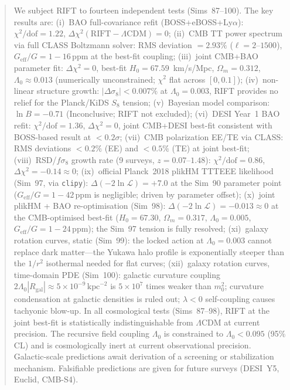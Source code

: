 \documentclass[12pt,a4paper]{article}
\begin{document}
\begin{abstract}
We subject RIFT to fourteen independent tests (Sims~87--100).
The key results are:
(i)~BAO full-covariance refit (BOSS+eBOSS+Ly$\alpha$):
    $\chi^2/\mathrm{dof}=1.22$, $\Delta\chi^2(\mathrm{RIFT}-\Lambda\mathrm{CDM})=0$;
(ii)~CMB TT power spectrum via full CLASS Boltzmann solver: RMS deviation $=2.93\%$
    ($\ell=2$--$1500$), $G_{\mathrm{eff}}/G = 1-16\,\mathrm{ppm}$ at the best-fit
    coupling;
(iii)~joint CMB+BAO parameter fit:
    $\Delta\chi^2=0$, best-fit $H_0=67.59$~km/s/Mpc, $\Omega_m=0.312$,
    $\Lambda_0\approx0.013$ (numerically unconstrained; $\chi^2$ flat across $[0,0.1]$);
(iv)~non-linear structure growth: $|\Delta\sigma_8|<0.007\%$ at $\Lambda_0=0.003$,
    RIFT provides no relief for the Planck/KiDS $S_8$ tension;
(v)~Bayesian model comparison: $\ln B = -0.71$ (Inconclusive; RIFT not excluded);
(vi)~DESI Year~1 BAO refit: $\chi^2/\mathrm{dof}=1.36$, $\Delta\chi^2=0$,
    joint CMB+DESI best-fit consistent with BOSS-based result at $<0.2\sigma$;
(vii)~CMB polarization EE/TE via CLASS: RMS deviations $<0.2\%$ (EE) and
    $<0.5\%$ (TE) at joint best-fit;
(viii)~RSD/$f\sigma_8$ growth rate (9 surveys, $z=0.07$--$1.48$):
    $\chi^2/\mathrm{dof}=0.86$, $\Delta\chi^2=-0.14\approx0$;
(ix)~official Planck~2018 plikHM TTTEEE likelihood (Sim~97, via \texttt{clipy}):
    $\Delta(-2\ln\mathcal{L})=+7.0$ at the Sim~90 parameter point
    ($G_\mathrm{eff}/G=1-42\,\mathrm{ppm}$ is negligible; driven by parameter offset);
(x)~joint plikHM + BAO re-optimisation (Sim~98): $\Delta(-2\ln\mathcal{L})=-0.013\approx 0$
    at the CMB-optimised best-fit ($H_0=67.30$, $\Omega_m=0.317$, $\Lambda_0=0.005$,
    $G_\mathrm{eff}/G=1-24\,\mathrm{ppm}$); the Sim~97 tension is fully resolved;
(xi)~galaxy rotation curves, static (Sim~99): the locked action at $\Lambda_0=0.003$
    cannot replace dark matter---the Yukawa halo profile is exponentially steeper
    than the $1/r^2$ isothermal needed for flat curves;
(xii)~galaxy rotation curves, time-domain PDE (Sim~100): galactic curvature coupling
    $2\Lambda_0|R_\mathrm{gal}|\approx5\times10^{-9}\,\mathrm{kpc}^{-2}$ is
    $5\times10^7$ times weaker than $m_0^2$; curvature condensation at galactic
    densities is ruled out; $\lambda<0$ self-coupling causes tachyonic blow-up.
In all cosmological tests (Sims~87--98), RIFT at the joint best-fit is statistically
indistinguishable from $\Lambda$CDM at current precision. The recursive field
coupling $\Lambda_0$ is constrained to $\Lambda_0 < 0.095$ (95\% CL) and is
cosmologically inert at current observational precision. Galactic-scale predictions
await derivation of a screening or stabilization mechanism. Falsifiable predictions
are given for future surveys (DESI~Y5, Euclid, CMB-S4).
\end{abstract}
\end{document}
